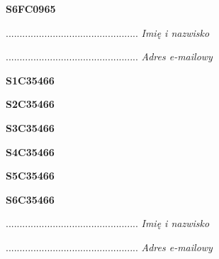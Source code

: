 \begin{turn}{90}\huge \textbf{S6FC0965}\end{turn}

\begin{turn}{90}\begin{minipage}{\linewidth} \vspace{20mm} ................................................  \textit{Imię i nazwisko}\end{minipage}\end{turn}

\begin{turn}{90}\begin{minipage}{\linewidth} \vspace{20mm} ................................................  \textit{Adres e-mailowy}\end{minipage}\end{turn}

\begin{turn}{90}\huge \textbf{S1C35466}\end{turn}

\begin{turn}{90}\huge \textbf{S2C35466}\end{turn}

\begin{turn}{90}\huge \textbf{S3C35466}\end{turn}

\begin{turn}{90}\huge \textbf{S4C35466}\end{turn}

\begin{turn}{90}\huge \textbf{S5C35466}\end{turn}

\begin{turn}{90}\huge \textbf{S6C35466}\end{turn}

\begin{turn}{90}\begin{minipage}{\linewidth} \vspace{20mm} ................................................  \textit{Imię i nazwisko}\end{minipage}\end{turn}

\begin{turn}{90}\begin{minipage}{\linewidth} \vspace{20mm} ................................................  \textit{Adres e-mailowy}\end{minipage}\end{turn}

